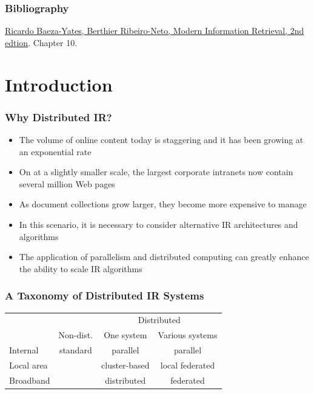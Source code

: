 \documentclass{beamer}
\subtitle{Distributed Information Retrieval}
\begin{document}
\maketitle


\makeoutline

\begin{frame}
    \frametitle{Bibliography}
    \begin{block}{}
        \href{http://www.mir2ed.org/}{Ricardo Baeza-Yates,
            Berthier Ribeiro-Neto, Modern Information Retrieval, 2nd
            edtion}. Chapter 10.
    \end{block}
\end{frame}

\section{Introduction}

\begin{frame}
    \frametitle{Why Distributed IR?}
    
    \begin{itemize}
    \item The volume of online content today is staggering and it has been
        growing at an exponential rate
    \item On at a slightly smaller scale, the largest corporate intranets now
        contain several million Web pages
    \item As document collections grow larger, they become more expensive to
        manage
    \item In this scenario, it is necessary to consider alternative IR
        architectures and algorithms
    \item The application of parallelism and distributed computing can greatly
        enhance the ability to scale IR algorithms
    \end{itemize}
\end{frame}

\begin{frame}
    \frametitle{A Taxonomy of Distributed IR Systems}
    
    \begin{center}
        \begin{tabular}{|l|c|c|c|}\hline
          & & \multicolumn{2}{|c|}{Distributed} \\\cline{3-4}
          & Non-dist. & One system & Various systems \\\hline\hline
          Internal & standard & parallel & parallel \\\hline
          Local area & & cluster-based & local federated \\\hline
          Broadband & & distributed & federated \\\hline
        \end{tabular}
    \end{center}
\end{frame}
\end{document}
